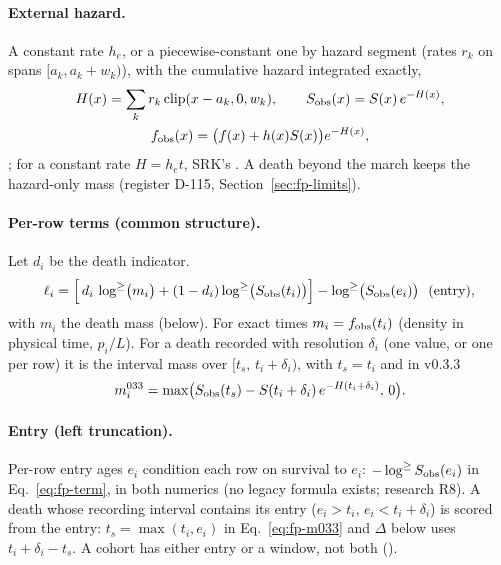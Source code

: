 \paragraph{External hazard.} A constant rate $h_e$, or a piecewise-constant one by hazard segment (rates $r_k$ on
spans $[a_k,a_k+w_k)$), with the cumulative hazard integrated exactly,
\begin{equation}
  \begin{gathered}H(x)=\sum_kr_k\,\mathrm{clip}(x-a_k,0,w_k),\qquad S_{\rm obs}(x)=S(x)\,e^{-H(x)},\\ f_{\rm obs}(x)=\big(f(x)+h(x)S(x)\big)e^{-H(x)},\end{gathered}
\end{equation}
; for a constant rate $H=h_et$, SRK's . A death
beyond the march keeps the hazard-only mass (register D-115, Section~\ref{sec:fp-limits}).

\paragraph{Per-row terms (common structure).} Let $d_i$ be the death indicator.
\begin{equation}
  \ell_i=\Big[\,d_i\,\log^{\ge}\!\big(m_i\big)+(1-d_i)\log^{\ge}\!\big(S_{\rm obs}(t_i)\big)\Big]-\log^{\ge}\!\big(S_{\rm obs}(e_i)\big)\ \ (\text{entry}),
  \label{eq:fp-term}
\end{equation}
with $m_i$ the death mass (below). For exact times $m_i=f_{\rm obs}(t_i)$ (density in physical time, $p_i/L$). For a
death recorded with resolution $\delta_i$ (one value, or one per row) it is the interval mass over
$[t_s,\,t_i+\delta_i)$, with $t_s=t_i$ and in v0.3.3
\begin{equation}
  m_i^{033}=\max\!\big(S_{\rm obs}(t_s)-S(t_i+\delta_i)\,e^{-H(t_i+\delta_i)},\,0\big).
  \label{eq:fp-m033}
\end{equation}

\paragraph{Entry (left truncation).} Per-row entry ages $e_i$ condition each row on survival to $e_i$:
$-\log^{\ge}S_{\rm obs}(e_i)$ in Eq.~\eqref{eq:fp-term}, in both numerics (no legacy formula exists; research R8).
A death whose recording interval contains its entry ($e_i>t_i$, $e_i<t_i+\delta_i$) is scored from the entry:
$t_s=\max(t_i,e_i)$ in Eq.~\eqref{eq:fp-m033} and $\Delta$ below uses $t_i+\delta_i-t_s$. A cohort has either entry or a
window, not both ().

